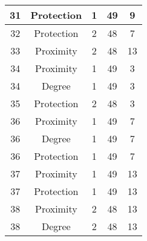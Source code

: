 \documentclass[results.tex]{subfiles}
\begin{document}
\begin{center}
\begin{tabular}{| c || c | c | c | c |}
            \hline
            31                      & Protection                   & 1                      & 49                      & 9                    \\
            \hline
            32                      & Protection                   & 2                      & 48                      & 7                    \\
            \hline
            33                      & Proximity                    & 2                      & 48                      & 13                   \\
            \hline
            34                      & Proximity                    & 1                      & 49                      & 3                    \\
            \hline
            34                      & Degree                       & 1                      & 49                      & 3                    \\
            \hline
            35                      & Protection                   & 2                      & 48                      & 3                    \\
            \hline
            36                      & Proximity                    & 1                      & 49                      & 7                    \\
            \hline
            36                      & Degree                       & 1                      & 49                      & 7                    \\
            \hline
            36                      & Protection                   & 1                      & 49                      & 7                    \\
            \hline
            37                      & Proximity                    & 1                      & 49                      & 13                   \\
            \hline
            37                      & Protection                   & 1                      & 49                      & 13                   \\
            \hline
            38                      & Proximity                    & 2                      & 48                      & 13                   \\
            \hline
            38                      & Degree                       & 2                      & 48                      & 13                   \\

\end{tabular}
\end{center}
\end{document}
